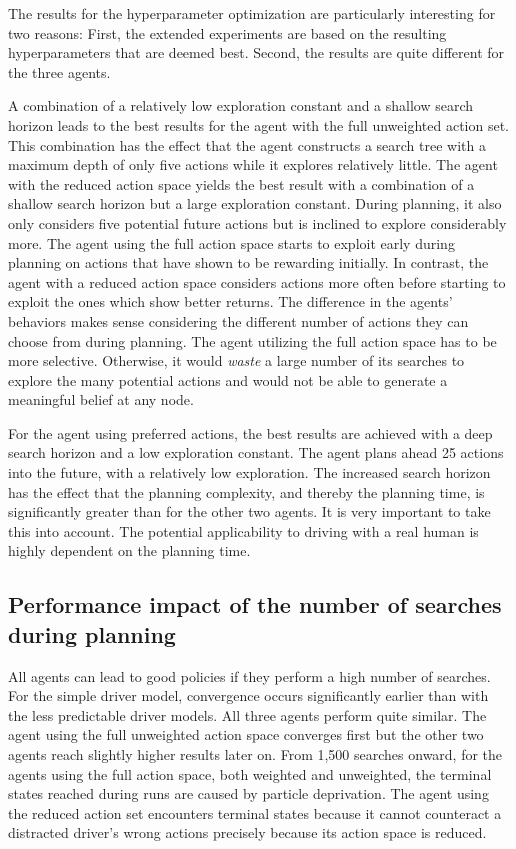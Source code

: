 The results for the hyperparameter optimization are particularly interesting for two reasons: First, the extended experiments are based on the resulting hyperparameters that are deemed best. Second, the results are quite different for the three agents. 

A combination of a relatively low exploration constant and a shallow search horizon leads to the best results for the agent with the full unweighted action set. This combination has the effect that the agent constructs a search tree with a maximum depth of only five actions while it explores relatively little. The agent with the reduced action space yields the best result with a combination of a shallow search horizon but a large exploration constant. During planning, it also only considers five potential future actions but is inclined to explore considerably more. The agent using the full action space starts to exploit early during planning on actions that have shown to be rewarding initially. In contrast, the agent with a reduced action space considers actions more often before starting to exploit the ones which show better returns. The difference in the agents' behaviors makes sense considering the different number of actions they can choose from during planning. The agent utilizing the full action space has to be more selective. Otherwise, it would \emph{waste} a large number of its searches to explore the many potential actions and would not be able to generate a meaningful belief at any node.

For the agent using preferred actions, the best results are achieved with a deep search horizon and a low exploration constant. The agent plans ahead 25 actions into the future, with a relatively low exploration. The increased search horizon has the effect that the planning complexity, and thereby the planning time, is significantly greater than for the other two agents. It is very important to take this into account. The potential applicability to driving with a real human is highly dependent on the planning time.

\subsection{Performance impact of the number of searches during planning}

All agents can lead to good policies if they perform a high number of searches. For the simple driver model, convergence occurs significantly earlier than with the less predictable driver models. All three agents perform quite similar. The agent using the full unweighted action space converges first but the other two agents reach slightly higher results later on. From 1,500 searches onward, for the agents using the full action space, both weighted and unweighted, the terminal states reached during runs are caused by particle deprivation. The agent using the reduced action set encounters terminal states because it cannot counteract a distracted driver's wrong actions precisely because its action space is reduced.

